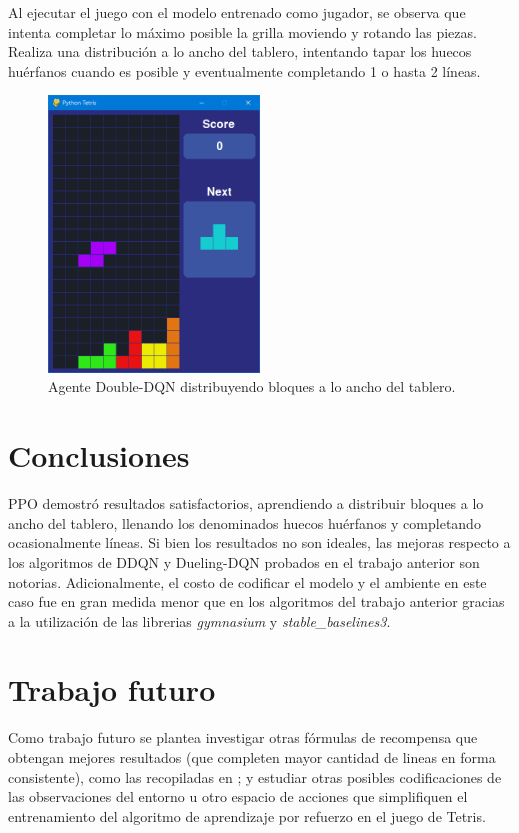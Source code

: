 Al ejecutar el juego con el modelo entrenado como jugador, se observa que intenta completar lo máximo posible la grilla moviendo y rotando las piezas. Realiza una distribución a lo ancho del tablero, intentando tapar los huecos huérfanos cuando es posible y eventualmente completando 1 o hasta 2 líneas.

\begin{figure}[htbp]
	\centering
	\includegraphics[width=0.5\textwidth]{./Figures/ppo_playing.png}
	\caption{Agente Double-DQN distribuyendo bloques a lo ancho del tablero.}
	\label{fig:ppo_playing}
\end{figure}

\section{Conclusiones}
\label{sec:conclusions}

PPO demostró resultados satisfactorios, aprendiendo a distribuir bloques a lo ancho del tablero, llenando los denominados huecos huérfanos y completando ocasionalmente líneas. Si bien los resultados no son ideales, las mejoras respecto a los algoritmos de DDQN y Dueling-DQN probados en el trabajo anterior son notorias. Adicionalmente, el costo de codificar el modelo y el ambiente en este caso fue en gran medida menor que en los algoritmos del trabajo anterior gracias a la utilización de las librerias \textit{gymnasium} y \textit{stable\_baselines3}.

\section{Trabajo futuro}

Como trabajo futuro se plantea investigar otras fórmulas de recompensa que obtengan mejores resultados (que completen mayor cantidad de lineas en forma consistente), como las recopiladas en \citep{ARTICLE:3}; y estudiar otras posibles codificaciones de las observaciones del entorno u otro espacio de acciones que simplifiquen el entrenamiento del algoritmo de aprendizaje por refuerzo en el juego de Tetris.